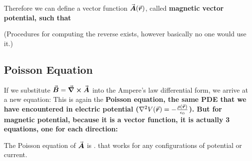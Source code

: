\documentclass[class=article, crop=false, 12pt]{standalone}
\begin{document}
Therefore we can define a vector function $\va*{A}(\va*{r})$,
called \bf{magnetic vector potential}, such that 

(Procedures for computing the reverse exists, however basically no one would use it.)

\subsection{Poisson Equation}

If we substitute $\va*{B} = \curl \va*{A}$ into the Ampere's law differential form,
we arrive at a new equation: 
This is again the \bf{Poisson equation}, 
the same PDE that we have encountered in electric potential 
($\laplacian V(\vvec{r}) = - \frac{\rho(\vvec{r})}{\epsilon_0}$).
But for magnetic potential,
because it is a vector function, 
it is actually 3 equations, one for each direction:

The Poisson equation of $\va*{A}$ is 
.
that works for any configurations of potential or current.
\end{document}
